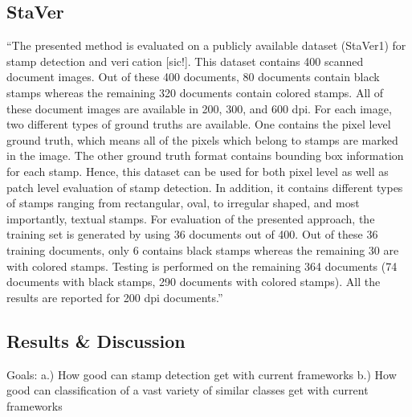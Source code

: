\subsection{StaVer}\label{sect:staver}
``The presented method is evaluated on a publicly available dataset (StaVer1) for stamp
detection and verication [sic!]. This dataset contains 400 scanned document images. Out
of these 400 documents, 80 documents contain black stamps whereas the remaining 320
documents contain colored stamps. All of these document images are available in 200,
300, and 600 dpi. For each image, two different types of ground truths are available.
One contains the pixel level ground truth, which means all of the pixels which belong to
stamps are marked in the image. The other ground truth format contains bounding box
information for each stamp. Hence, this dataset can be used for both pixel level as well
as patch level evaluation of stamp detection. In addition, it contains different types of
stamps ranging from rectangular, oval, to irregular shaped, and most importantly, textual
stamps.
For evaluation of the presented approach, the training set is generated by using 36 documents
out of 400. Out of these 36 training documents, only 6 contains black stamps
whereas the remaining 30 are with colored stamps. Testing is performed on the remaining
364 documents (74 documents with black stamps, 290 documents with colored stamps).
All the results are reported for 200 dpi documents.''~\cite{Ahmed.2016}

\subsection{Results \& Discussion}\label{sect:results-and-discussion}
Goals: 
    a.) How good can stamp detection get with current frameworks
    b.) How good can classification of a vast variety of similar classes get
        with current frameworks